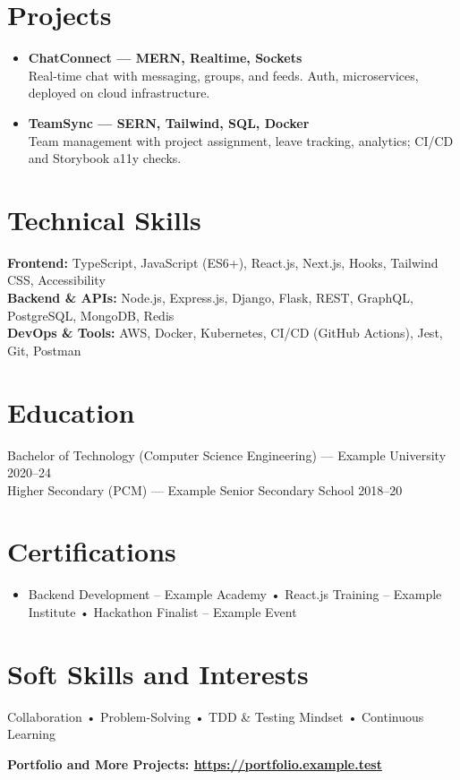 \documentclass[a4paper,11pt]{article}
\begin{document}
\section*{Projects}
\begin{itemize}
  \item[\textbullet] \textbf{ChatConnect — MERN, Realtime, Sockets} \\
  Real-time chat with messaging, groups, and feeds. Auth, microservices, deployed on cloud infrastructure.
  \vspace{2pt}
  \item[\textbullet] \textbf{TeamSync — SERN, Tailwind, SQL, Docker} \\
  Team management with project assignment, leave tracking, analytics; CI/CD and Storybook a11y checks.
  \vspace{2pt}
\end{itemize}

\section*{Technical Skills}
\noindent \textbf{Frontend:} TypeScript, JavaScript (ES6+), React.js, Next.js, Hooks, Tailwind CSS, Accessibility \\
\noindent \textbf{Backend \& APIs:} Node.js, Express.js, Django, Flask, REST, GraphQL, PostgreSQL, MongoDB, Redis \\
\noindent \textbf{DevOps \& Tools:} AWS, Docker, Kubernetes, CI/CD (GitHub Actions), Jest, Git, Postman
\section*{Education}
Bachelor of Technology (Computer Science Engineering) — Example University \hfill 2020–24 \\
Higher Secondary (PCM) — Example Senior Secondary School \hfill 2018–20
\section*{Certifications}
\begin{itemize}[label=--, leftmargin=*]
    \item Backend Development – Example Academy • React.js Training – Example Institute • Hackathon Finalist – Example Event
\end{itemize}
\section*{Soft Skills and Interests}
Collaboration • Problem-Solving • TDD \& Testing Mindset • Continuous Learning
\vspace{5pt}
\begin{center}
    \textbf{Portfolio and More Projects: \href{https://portfolio.example.test}{https://portfolio.example.test}}
\end{center}
\end{document}
